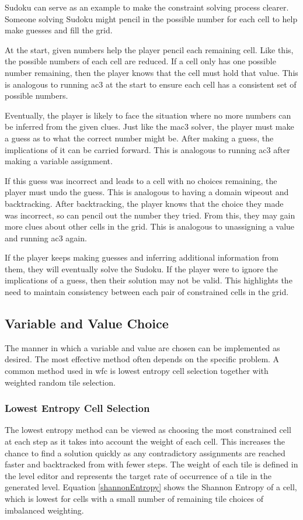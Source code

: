 Sudoku can serve as an example to make the constraint solving process clearer. Someone solving Sudoku might pencil in the possible number for each cell to help make guesses and fill the grid.

At the start, given numbers help the player pencil each remaining cell. Like this, the possible numbers of each cell are reduced. If a cell only has one possible number remaining, then the player knows that the cell must hold that value. This is analogous to running \acrshort{ac3} at the start to ensure each cell has a consistent set of possible numbers.

Eventually, the player is likely to face the situation where no more numbers can be inferred from the given clues. Just like the \acrshort{mac3} solver, the player must make a guess as to what the correct number might be. After making a guess, the implications of it can be carried forward. This is analogous to running \acrshort{ac3} after making a variable assignment.

If this guess was incorrect and leads to a cell with no choices remaining, the player must undo the guess. This is analogous to having a domain wipeout and backtracking. After backtracking, the player knows that the choice they made was incorrect, so can pencil out the number they tried. From this, they may gain more clues about other cells in the grid. This is analogous to unassigning a value and running \acrshort{ac3} again.

If the player keeps making guesses and inferring additional information from them, they will eventually solve the Sudoku. If the player were to ignore the implications of a guess, then their solution may not be valid. This highlights the need to maintain consistency between each pair of constrained cells in the grid.

\subsection{Variable and Value Choice}\label{sec:variableAndValueChoice}
The manner in which a variable and value are chosen can be implemented as desired. The most effective method often depends on the specific problem. A common method used in \acrlong{wfc} is lowest entropy cell selection together with weighted random tile selection.

\subsubsection{Lowest Entropy Cell Selection}
The lowest entropy method can be viewed as choosing the most constrained cell at each step as it takes into account the weight of each cell. This increases the chance to find a solution quickly as any contradictory assignments are reached faster and backtracked from with fewer steps. The weight of each tile is defined in the level editor and represents the target rate of occurrence of a tile in the generated level. Equation \ref{shannonEntropy} shows the Shannon Entropy of a cell, which is lowest for cells with a small number of remaining tile choices of imbalanced weighting.%

